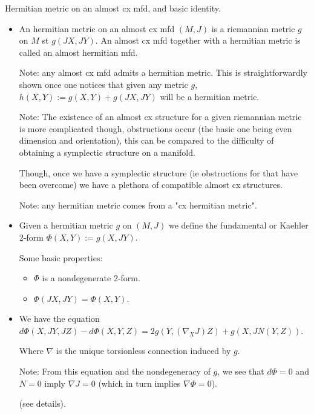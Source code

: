 \documentclass{report}
\theoremstyle{definition}
\begin{document}
Hermitian metric on an almost cx mfd, and basic identity.
\begin{itemize}
    \item An hermitian metric on an almost cx mfd $(M,J)$ is a riemannian metric $g$ on $M$ st $g(JX,JY)$. An almost cx mfd together with a hermitian metric is called an almost hermitian mfd.

    Note: any almost cx mfd admits a hermitian metric. This is straightforwardly shown once one notices that given any metric $g$, $h(X,Y):=g(X,Y)+g(JX,JY)$ will be a hermitian metric.

    Note: The existence of an almost cx structure for a given riemannian metric is more complicated though, obstructions occur (the basic one being even dimension and orientation), this can be compared to the difficulty of obtaining a symplectic structure on a manifold.

    Though, once we have a symplectic structure (ie obstructions for that have been overcome) we have a plethora of compatible almost cx structures.

    Note: any hermitian metric comes from a "cx hermitian metric".

    \item Given a hermitian metric $g$ on $(M,J)$ we define the fundamental or Kaehler 2-form $\Phi(X,Y):=g(X,JY)$.

    Some basic properties:
    \begin{itemize}
        \item $\Phi$ is a nondegenerate 2-form.
        \item $\Phi(JX,JY)=\Phi(X,Y)$.
    \end{itemize}

    \item We have the equation $d\Phi(X,JY,JZ)-d\Phi(X,Y,Z)=2g(Y,(\nabla_XJ)Z)+g(X,JN(Y,Z))$.

    Where $\nabla$ is the unique torsionless connection induced by $g$.

    Note: From this equation and the nondegeneracy of $g$, we see that $d\Phi=0$ and $N=0$ imply $\nabla J=0$ (which in turn implies $\nabla \Phi=0$).

    (see details).
\end{itemize}
\end{document}
